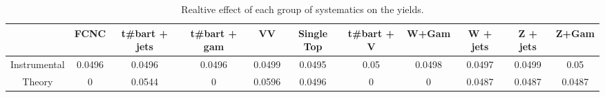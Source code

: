 \begin{table}[htbp]
\begin{center}
\begin{tabular}{|c|c|c|c|c|c|c|c|c|c|c|}
\hline 
      & FCNC      & t#bar{t} + jets      & t#bar{t} +  gam      & VV      & Single Top      & t#bar{t} + V      & W+Gam      & W + jets      & Z + jets      & Z+Gam \\ 
\hline 
 Instrumental & 0.0496 & 0.0496 & 0.0496 & 0.0499 & 0.0495 & 0.05 & 0.0498 & 0.0497 & 0.0499 & 0.05 \\ 
 Theory & 0 & 0.0544 & 0 & 0.0596 & 0.0496 & 0 & 0 & 0.0487 & 0.0487 & 0.0487 \\ 
\hline 
\end{tabular} 
\caption{Realtive effect of each group of systematics on the yields.} 
\end{center} 
\end{table} 

